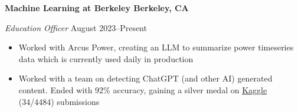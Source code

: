 \textbf{Machine Learning at Berkeley \hfill Berkeley, CA}\par
\textit{Education Officer} \hfill August 2023--Present
\begin{itemize}
     \item  Worked with Arcus Power, creating an LLM to summarize power timeseries data which is currently used daily in production
	\item Worked with a team on detecting ChatGPT (and other AI) generated content. Ended with 92\% accuracy, gaining a silver medal on \href{https://www.kaggle.com/competitions/llm-detect-ai-generated-text/leaderboard}{Kaggle} (34/4484) submissions
\end{itemize}\par
